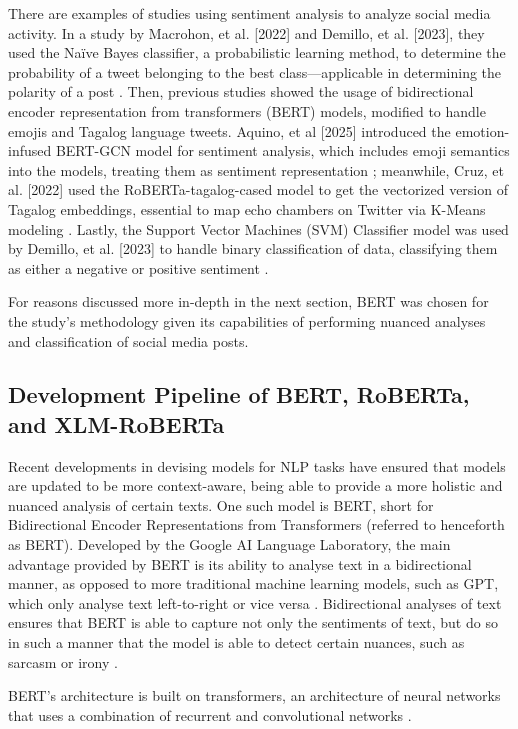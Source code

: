 There are examples of studies using sentiment analysis to analyze social media activity. In a study by Macrohon, et al. [2022] and Demillo, et al. [2023], they used the Naïve Bayes classifier, a probabilistic learning method, to determine the probability of a tweet belonging to the best class—applicable in determining the polarity of a post \cite{Macrohon-2022,Demillo-2023}. Then, previous studies showed the usage of bidirectional encoder representation from transformers (BERT) models, modified to handle emojis and Tagalog language tweets. Aquino, et al [2025] introduced the emotion-infused BERT-GCN model for sentiment analysis, which includes emoji semantics into the models, treating them as sentiment representation \cite{Aquino-2025}; meanwhile, Cruz, et al. [2022] used the RoBERTa-tagalog-cased model to get the vectorized version of Tagalog embeddings, essential to map echo chambers on Twitter via K-Means modeling \cite{Cruz-2022}. Lastly, the Support Vector Machines (SVM) Classifier model was used by Demillo, et al. [2023] to handle binary classification of data, classifying them as either a negative or positive sentiment \cite{Demillo-2023}.

For reasons discussed more in-depth in the next section, BERT was chosen for the study’s methodology given its capabilities of performing nuanced analyses and classification of social media posts.

\subsection{Development Pipeline of BERT, RoBERTa, and XLM-RoBERTa}
Recent developments in devising models for NLP tasks have ensured that models are updated to be more context-aware, being able to provide a more holistic and nuanced analysis of certain texts. One such model is BERT, short for Bidirectional Encoder Representations from Transformers (referred to henceforth as BERT). Developed by the Google AI Language Laboratory, the main advantage provided by BERT is its ability to analyse text in a bidirectional manner, as opposed to more traditional machine learning models, such as GPT, which only analyse text left-to-right or vice versa \cite{Koroteev-2021}. Bidirectional analyses of text ensures that BERT is able to capture not only the sentiments of text, but do so in such a manner that the model is able to detect certain nuances, such as sarcasm or irony \cite{Dong-2020}.

BERT’s architecture is built on transformers, an architecture of neural networks that uses a combination of recurrent and convolutional networks \cite{Koroteev-2021}.

